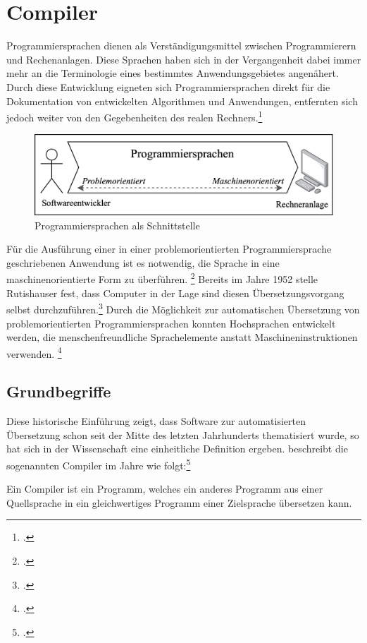 \chapter{Compiler}


Programmiersprachen dienen als Verständigungsmittel zwischen Programmierern und Rechenanlagen. Diese Sprachen haben sich in der Vergangenheit dabei immer mehr an die  Terminologie eines bestimmtes Anwendungsgebietes angenähert. Durch diese Entwicklung eigneten sich Programmiersprachen direkt für die Dokumentation von entwickelten Algorithmen und Anwendungen, entfernten sich jedoch weiter von den Gegebenheiten des realen Rechners.\footcite[Vgl.][S. 15]{Schneider1975}
\begin{figure}[h]
 \includegraphics[width=\textwidth,height=\textheight,keepaspectratio]{Images/LanguageIntermediary.png}
 \caption{Programmiersprachen als Schnittstelle}
 \label{fig:Programmiersprachen als Schnittstelle}
\end{figure}
Für die Ausführung einer in einer problemorientierten Programmiersprache geschriebenen Anwendung ist es notwendig, die Sprache in eine maschinenorientierte Form zu überführen. \footcite[Vgl.][S. 15]{Schneider1975} Bereits im Jahre 1952 stelle Rutishauser fest,  dass Computer in der Lage sind diesen Übersetzungsvorgang selbst durchzuführen.\footcite[Vgl.][S. 312]{Rutishauser1952} 
Durch die Möglichkeit zur automatischen Übersetzung von problemorientierten Programmiersprachen konnten Hochsprachen entwickelt werden, die menschenfreundliche Sprachelemente anstatt Maschineninstruktionen verwenden. \footcite[Vgl.][S. 47]{Wagenknecht2014}
\section{ Grundbegriffe}
Diese historische Einführung zeigt,  dass Software zur automatisierten Übersetzung schon seit der Mitte des letzten Jahrhunderts thematisiert wurde, so hat sich in der Wissenschaft eine einheitliche Definition ergeben.  \citeauthor{Ullmann2008} beschreibt die sogenannten Compiler im Jahre \citeyear{Ullmann2008} wie folgt:\footcite[Vgl.][S. 1]{Ullmann2008} 
\begin{Def}[Compiler]
Ein Compiler ist ein Programm, welches ein anderes Programm aus einer Quellsprache in ein gleichwertiges Programm einer Zielsprache übersetzen kann.
\end{Def} 
\vspace{-1em}

